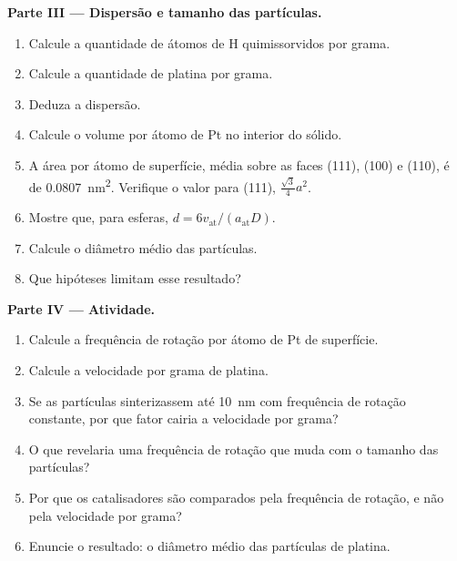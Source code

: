 \begin{problem}
\medskip\noindent\textbf{Parte III --- Dispersão e tamanho das partículas.}
\begin{enumerate}[resume]
  \item Calcule a quantidade de átomos de H quimissorvidos por grama.
  \item Calcule a quantidade de platina por grama.
  \item Deduza a dispersão.
  \item Calcule o volume por átomo de Pt no interior do sólido.
  \item A área por átomo de superfície, média sobre as faces (111), (100) e (110),
        é de \qty{0.0807}{nm^2}. Verifique o valor para (111), $\frac{\sqrt3}{4}a^2$.
  \item Mostre que, para esferas, $d = 6v_{\mathrm{at}}/(a_{\mathrm{at}}D)$.
  \item Calcule o diâmetro médio das partículas.
  \item Que hipóteses limitam esse resultado?
\end{enumerate}

\medskip\noindent\textbf{Parte IV --- Atividade.}
\begin{enumerate}[resume]
  \item Calcule a frequência de rotação por átomo de Pt de superfície.
  \item Calcule a velocidade por grama de platina.
  \item Se as partículas sinterizassem até \qty{10}{nm} com frequência de rotação
        constante, por que fator cairia a velocidade por grama?
  \item O que revelaria uma frequência de rotação que muda com o tamanho das partículas?
  \item Por que os catalisadores são comparados pela frequência de rotação, e não pela
        velocidade por grama?
  \item Enuncie o resultado: o diâmetro médio das partículas de platina.
\end{enumerate}
\end{problem}
